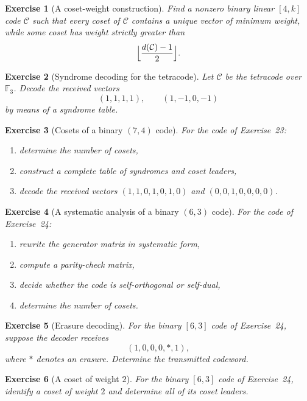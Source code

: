 \documentclass[11pt]{amsbook}
\theoremstyle{exstyle}
\newtheorem{exercise}{Exercise}
\theoremstyle{plain}
\newcommand{\F}{\mathbb{F}}
\newcommand{\Ccal}{\mathcal{C}}
\begin{document}
\begin{exercise}[A coset-weight construction]
Find a nonzero binary linear $[4,k]$ code $\Ccal$ such that every coset of $\Ccal$ contains a unique vector of minimum weight, while some coset has weight strictly greater than
\[
\Bigl\lfloor\frac{d(\Ccal)-1}{2}\Bigr\rfloor.
\]
\end{exercise}

\begin{exercise}[Syndrome decoding for the tetracode]
Let $\Ccal$ be the tetracode over $\F_3$. Decode the received vectors
\[
(1,1,1,1),\qquad (1,-1,0,-1)
\]
by means of a syndrome table.
\end{exercise}

\begin{exercise}[Cosets of a binary $(7,4)$ code]
For the code of Exercise~23:
\begin{enumerate}[label=\textup{(\arabic*)}]
\item determine the number of cosets,
\item construct a complete table of syndromes and coset leaders,
\item decode the received vectors $(1,1,0,1,0,1,0)$ and $(0,0,1,0,0,0,0)$.
\end{enumerate}
\end{exercise}

\begin{exercise}[A systematic analysis of a binary $(6,3)$ code]
For the code of Exercise~24:
\begin{enumerate}[label=\textup{(\arabic*)}]
\item rewrite the generator matrix in systematic form,
\item compute a parity-check matrix,
\item decide whether the code is self-orthogonal or self-dual,
\item determine the number of cosets.
\end{enumerate}
\end{exercise}

\begin{exercise}[Erasure decoding]
For the binary $[6,3]$ code of Exercise~24, suppose the decoder receives
\[
(1,0,0,0,\ast,1),
\]
where $\ast$ denotes an erasure. Determine the transmitted codeword.
\end{exercise}

\begin{exercise}[A coset of weight $2$]
For the binary $[6,3]$ code of Exercise~24, identify a coset of weight $2$ and determine all of its coset leaders.
\end{exercise}
\end{document}
